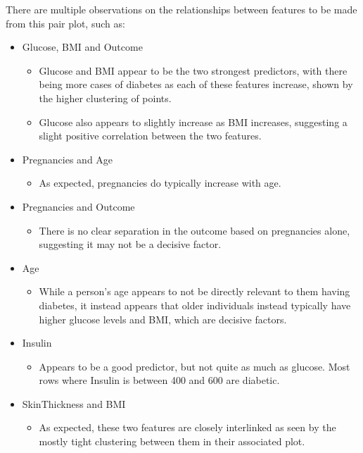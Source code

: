 \para There are multiple observations on the relationships between features to be made from this pair plot, such as:
\begin{itemize}
    \item Glucose, BMI and Outcome 
        \begin{itemize}
            \item Glucose and BMI appear to be the two strongest predictors, with there being more cases of diabetes as each of these features increase,
            shown by the higher clustering of points. 
            \item Glucose also appears to slightly increase as BMI increases, suggesting a slight positive correlation between the two features. 
        \end{itemize}
    \item Pregnancies and Age
        \begin{itemize}
            \item As expected, pregnancies do typically increase with age. 
        \end{itemize}
    \item Pregnancies and Outcome
        \begin{itemize}
            \item There is no clear separation in the outcome based on pregnancies alone, suggesting it may not be a decisive factor.
        \end{itemize}
    \item Age
        \begin{itemize}
            \item While a person's age appears to not be directly relevant to them having diabetes, it instead appears that older individuals 
            instead typically have higher glucose levels and BMI, which are decisive factors.
        \end{itemize}
    \item Insulin
        \begin{itemize}
            \item Appears to be a good predictor, but not quite as much as glucose. Most rows where Insulin is between 400 and 600 are diabetic.
        \end{itemize}
    \item SkinThickness and BMI
        \begin{itemize}
            \item As expected, these two features are closely interlinked as seen by the mostly tight clustering between them in their associated plot.
        \end{itemize}
\end{itemize}

